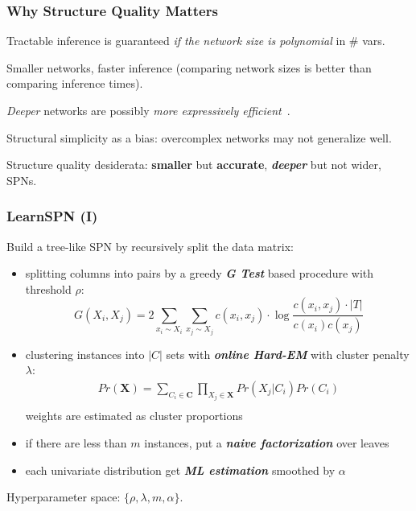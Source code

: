 \documentclass[xcolor={usenames,dvipsnames,svgnames}, compress]{beamer}
\begin{document}
\begin{frame}
  \frametitle{Why Structure Quality Matters}

  \footnotesize
  
  Tractable inference is guaranteed \emph{if the network size is polynomial} in \#
  vars.\par\bigskip

  Smaller networks, faster inference (comparing network sizes is better than comparing inference times).\par\bigskip

  \emph{Deeper} networks are possibly \emph{more expressively efficient}~\emph{\parencite{Martens2014,Zhao2015}}.\par\bigskip

  Structural simplicity as a bias: overcomplex networks may not generalize well.\par\bigskip
  
  Structure quality desiderata: \textbf{\textbf{smaller}} but \textbf{\textbf{accurate}}, \textbf{\emph{deeper}} but not
  wider, SPNs.

  
  
\end{frame}

\begin{frame}[t]
  \frametitle{LearnSPN (I)}
  \footnotesize
  Build a tree-like SPN by recursively split the data matrix:

  \begin{itemize}
  \item splitting columns into pairs by a greedy \textbf{\emph{G Test}} based
    procedure with threshold $\rho$:
    \[
    G(X_i, X_j) =  2\sum_{x_i \sim X_i}\sum_{x_j \sim X_j}c(x_i, x_j)\cdot \log\frac{c(x_i, x_j)\cdot |T|}{c(x_i)c(x_j)}
    \]
  \item clustering instances into $|C|$ sets with \textbf{\emph{online Hard-EM}} with cluster penalty
    $\lambda$:
    \[\begin{array}{cc}
        Pr(\mathbf{X})= \sum_{C_i \in \mathbf{C}}\prod_{X_j \in \mathbf{X}}Pr(X_j|C_i)Pr(C_i)\\
      \end{array}\]
      weights are estimated as cluster proportions
  \item if there are less than $m$ instances, put a \textbf{\emph{naive
    factorization}} over leaves
  \item each univariate distribution get \emph{\textbf{ML estimation}} smoothed by $\alpha$  
  \end{itemize}\par\bigskip

  Hyperparameter space: $\{\rho, \lambda, m, \alpha\}$.
  

\end{frame}
\end{document}
